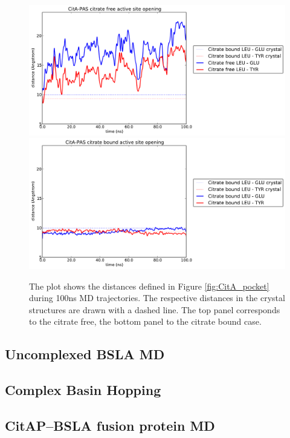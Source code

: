\documentclass[english, a4paper, 12pt, titlepage, draft]{article}
\begin{document}
\begin{figure}
    \centering
    \includegraphics[width=1.0\textwidth]{figures/CitA_opening_citrate_free.pdf}
    \includegraphics[width=1.0\textwidth]{figures/CitA_opening_citrate_bound.pdf}
    \caption{The plot shows the distances defined in Figure \ref{fig:CitA_pocket} during 100ns MD trajectories. The respective distances in the crystal structures are drawn with a dashed line. The top panel corresponds to the citrate free, the bottom panel to the citrate bound case.}
    \label{fig:CitA_opening_distances}
\end{figure}       



\subsection{Uncomplexed BSLA MD}
\subsection{Complex Basin Hopping}
\subsection{CitAP--BSLA fusion protein MD}
\end{document}
